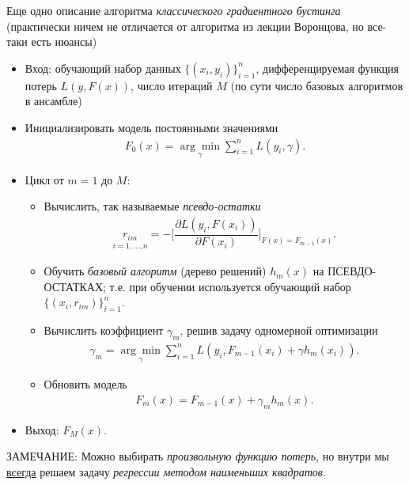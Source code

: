 \documentclass[%
	11pt,
	a4paper,
	utf8,
		]{article}
\begin{document}
Еще одно описание алгоритма \emph{классического градиентного бустинга} (практически ничем не отличается от алгоритма из лекции Воронцова, но все-таки есть нюансы)
\begin{itemize}
	\item Вход: обучающий набор данных $ \{(x_i, y_i)\}_{i=1}^n $, дифференцируемая функция потерь $ L(y, F(x)) $, число итераций $ M $ (по сути число базовых алгоритмов в ансамбле)
	\item Инициализировать модель постоянными значениями
	\begin{align*}
		F_0(x) = \underset{\gamma}{\arg \min} \sum_{i=1}^{n} L(y_i, \gamma).
	\end{align*}

    \item Цикл от $ m = 1 $ до $ M $:
    \begin{itemize}
    	\item Вычислить, так называемые \emph{псевдо-остатки}
    	\begin{align*}
    		\underset{i = 1, \ldots, n}{r_{im}} = - \Big[ \dfrac{\partial L(y_i, F(x_i))}{\partial F(x_i)} \Big]_{ F(x) = F_{m - 1}(x) }.
    	\end{align*}
    
        \item {\color{blue}Обучить \emph{базовый алгоритм} (дерево решений) $ h_m(x) $ на ПСЕВДО-ОСТАТКАХ}; т.е. при обучении используется обучающий набор $ \{ (x_i, r_{im}) \}_{i=1}^n $.
        
        \item Вычислить коэффициент $ \gamma_m $, решив задачу одномерной оптимизации
        \begin{align*}
        	\gamma_m = \underset{\gamma}{\arg \min} \sum_{i = 1}^{n} L(y_i, F_{m - 1}(x_i) + \gamma h_m(x_i)).
        \end{align*}
    
        \item Обновить модель 
        \begin{align*}
        	F_m(x) = F_{m - 1}(x) + \gamma_m h_m(x).
        \end{align*}
    \end{itemize}

    \item Выход: $ F_M(x) $.
\end{itemize}

ЗАМЕЧАНИЕ: Можно выбирать \emph{произвольную функцию потерь}, но внутри мы \underline{всегда} решаем задачу \emph{регрессии методом наименьших квадратов}.
\end{document}
